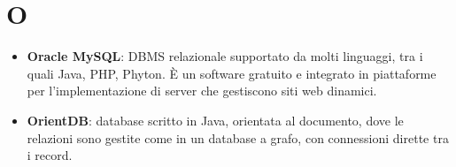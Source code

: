 \section{O}
\begin{itemize}
	\item \textbf{Oracle MySQL}: DBMS relazionale supportato da molti linguaggi, tra i quali Java, PHP, Phyton. \MakeUppercase{è} un software gratuito e integrato in piattaforme per l'implementazione di server che gestiscono siti web dinamici.
	\item \textbf{OrientDB}: database scritto in Java, orientata al documento, dove le relazioni sono gestite come in un database a grafo, con connessioni dirette tra i record. 
\end{itemize}
